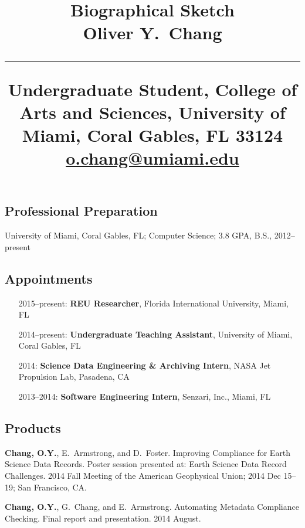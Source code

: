 \documentclass[svgnames,11pt]{article}
\title{%
        \vspace{-2\baselineskip}
            \normalsize
            Biographical Sketch\\
            \vspace{0.2\baselineskip}
            {\large\textbf{Oliver Y.~Chang}}\\
            \vspace{0.5\baselineskip}
            \hrule
            \vspace{0.5\baselineskip}
            Undergraduate Student, College of Arts and Sciences,
            University of Miami, Coral Gables, FL 33124\\
            \href{mailto:o.chang@umiami.edu}{o.chang@umiami.edu}
        \vspace{-1.5ex}
        }
\date{}
\author{}
\begin{document}
\maketitle
\vspace{-4\baselineskip}

\subsection{Professional Preparation}

    University of Miami, Coral Gables, FL;
        Computer Science;
        3.8 GPA, B.S., 2012--present

\subsection{Appointments}

\begin{itemize}[label={--9999:},leftmargin=*,itemsep=0pt]

    \item[2015--present:]
        \textbf{REU Researcher},
        Florida International University,
        Miami, FL

    \item[2014--present:]
        \textbf{Undergraduate Teaching Assistant},
        University of Miami,
        Coral Gables, FL

    \item[2014:]
        \textbf{Science Data Engineering \& Archiving Intern},
        NASA Jet Propulsion Lab,
        Pasadena, CA

    \item[2013--2014:]
        \textbf{Software Engineering Intern},
        Senzari, Inc.,
        Miami, FL

\end{itemize}

\subsection{Products}

\begin{bibenum}[itemsep=5pt]

    \item \textbf{Chang, O.Y.}, E.~Armstrong, and D.~Foster.
        Improving Compliance for Earth Science Data Records.
        Poster session presented at: Earth Science Data Record Challenges.
        2014 Fall Meeting of the American Geophysical Union; 2014 Dec 15--19; San Francisco, CA.

    \item \textbf{Chang, O.Y.}, G.~Chang, and E.~Armstrong.
        Automating Metadata Compliance Checking.
        Final report and presentation. 2014 August.

\end{bibenum}
\end{document}
